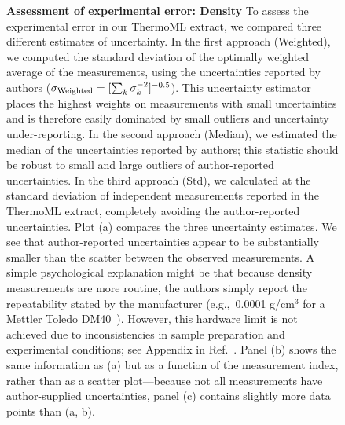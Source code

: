 \documentclass[journal=jacsat,manuscript=article]{achemso}
\begin{document}
\begin{figure}
\caption{{\bf Assessment of experimental error: Density}
To assess the experimental error in our ThermoML extract, we compared three different estimates of uncertainty.  
In the first approach (Weighted), we computed the standard deviation of the optimally weighted average of the measurements, using the uncertainties reported by authors ($\sigma_\textnormal{Weighted} = [\sum_k \sigma_k^{-2}]^{-0.5}$).
This uncertainty estimator places the highest weights on measurements with small uncertainties and is therefore easily dominated by small outliers and uncertainty under-reporting.
In the second approach (Median), we estimated the median of the uncertainties reported by authors; this statistic should be robust to small and large outliers of author-reported uncertainties.
In the third approach (Std), we calculated at the standard deviation of independent measurements reported in the ThermoML extract, completely avoiding the author-reported uncertainties.
Plot (a) compares the three uncertainty estimates.
We see that author-reported uncertainties appear to be substantially smaller than the scatter between the observed measurements.
A simple psychological explanation might be that because density measurements are more routine, the authors simply report the repeatability stated by the manufacturer (e.g.,~0.0001 g/cm$^{3}$ for a Mettler Toledo DM40~\cite{mettlertoledo}).  
However, this hardware limit is not achieved due to inconsistencies in sample preparation and experimental conditions; see Appendix in Ref.~\cite{chirico2013improvement}.  
Panel (b) shows the same information as (a) but as a function of the measurement index, rather than as a scatter plot---because not all measurements have author-supplied uncertainties, panel (c) contains slightly more data points than (a, b).  
}
\label{figure:ErrorAnalysisDensity}

\end{figure}



\clearpage
\end{document}
